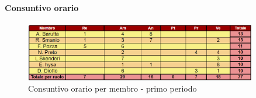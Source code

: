 \documentclass{article}
\begin{document}
\paragraph*{Consuntivo orario}

\begin{figure}[h]
    \centering
    \includegraphics[width=0.9\textwidth]{../Images/consuntivoOrario1Periodo.png}
    \caption{Consuntivo orario per membro - primo periodo}
    \label{fig:Cv1}
\end{figure}
\end{document}
